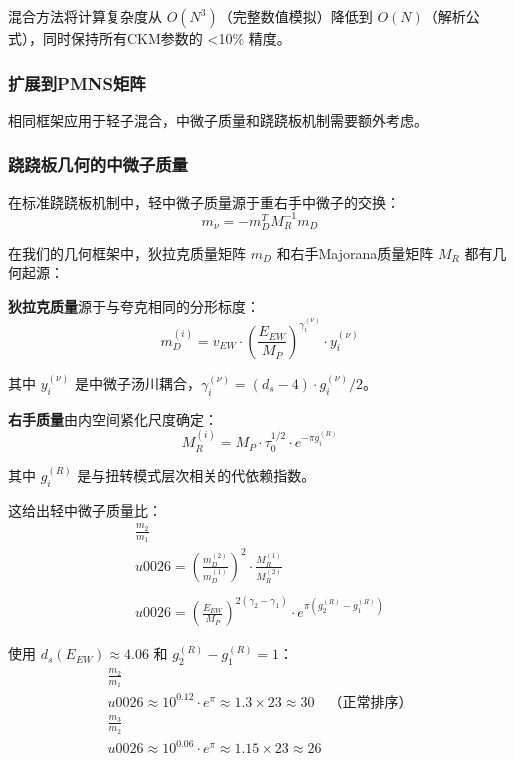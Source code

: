 混合方法将计算复杂度从 $O(N^3)$（完整数值模拟）降低到 $O(N)$（解析公式），同时保持所有CKM参数的 <10\% 精度。

\subsubsection{扩展到PMNS矩阵}

相同框架应用于轻子混合，中微子质量和跷跷板机制需要额外考虑。

\subsubsection{跷跷板几何的中微子质量}

在标准跷跷板机制中，轻中微子质量源于重右手中微子的交换：
\begin{equation}
    m_\nu = -m_D^T M_R^{-1} m_D
\end{equation}

在我们的几何框架中，狄拉克质量矩阵 $m_D$ 和右手Majorana质量矩阵 $M_R$ 都有几何起源：

\textbf{狄拉克质量}源于与夸克相同的分形标度：
\begin{equation}
    m_D^{(i)} = v_{EW} \cdot \left(\frac{E_{EW}}{M_P}\right)^{\gamma_i^{(\nu)}} \cdot y_i^{(\nu)}
\end{equation}

其中 $y_i^{(\nu)}$ 是中微子汤川耦合，$\gamma_i^{(\nu)} = (d_s - 4) \cdot g_i^{(\nu)}/2$。

\textbf{右手质量}由内空间紧化尺度确定：
\begin{equation}
    M_R^{(i)} = M_P \cdot \tau_0^{1/2} \cdot e^{-\pi g_i^{(R)}}
\end{equation}

其中 $g_i^{(R)}$ 是与扭转模式层次相关的代依赖指数。

这给出轻中微子质量比：
\begin{align}
    \frac{m_2}{m_1} \\u0026= \left(\frac{m_D^{(2)}}{m_D^{(1)}}\right)^2 \cdot \frac{M_R^{(1)}}{M_R^{(2)}} \\
    \\u0026= \left(\frac{E_{EW}}{M_P}\right)^{2(\gamma_2 - \gamma_1)} \cdot e^{\pi(g_2^{(R)} - g_1^{(R)})}
\end{align}

使用 $d_s(E_{EW}) \approx 4.06$ 和 $g_2^{(R)} - g_1^{(R)} = 1$：
\begin{align}
    \frac{m_2}{m_1} \\u0026\approx 10^{0.12} \cdot e^{\pi} \approx 1.3 \times 23 \approx 30
    \quad \text{（正常排序）} \\
    \frac{m_3}{m_2} \\u0026\approx 10^{0.06} \cdot e^{\pi} \approx 1.15 \times 23 \approx 26
\end{align}

